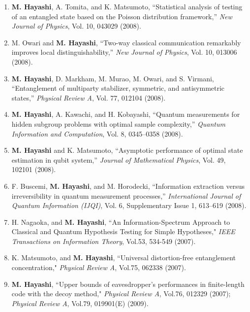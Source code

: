 \documentclass[a4paper,12pt,oneside]{article}
\begin{document}
\begin{enumerate}
\item   \textbf{M. Hayashi}, A. Tomita, and K. Matsumoto, 
``Statistical analysis of testing of an entangled state based on the Poisson distribution framework,'' 
{\em New Journal of Physics}, Vol. 10, 043029 (2008).

\item   M. Owari and \textbf{M. Hayashi}, 
``Two-way classical communication remarkably improves local distinguishability,'' 
{\em New Journal of Physics}, Vol. 10, 013006 (2008).

\item  \textbf{M. Hayashi}, D. Markham, M. Murao, M. Owari, and S. Virmani, 
``Entanglement of multiparty stabilizer, symmetric, and antisymmetric states,'' 
{\em Physical Review A}, Vol. 77, 012104 (2008).

\item \textbf{M. Hayashi}, A. Kawachi, and H. Kobayashi, 
``Quantum measurements for hidden subgroup problems with optimal sample complexity,'' 
{\em Quantum Information and Computation}, Vol. 8, 0345--0358 (2008). 

\item   \textbf{M. Hayashi} and K. Matsumoto, 
``Asymptotic performance of optimal state estimation in qubit system,'' 
{\em Journal of Mathematical Physics}, Vol. 49, 102101 (2008).

\item F. Buscemi, \textbf{M. Hayashi}, and M. Horodecki, 
``Information extraction versus irreversibility in quantum measurement processes,''
{\em International Journal of Quantum Information (IJQI)}, 
Vol. 6, Supplementary Issue 1, 613--619 (2008). 

\item
H. Nagaoka, and \textbf{M. Hayashi}, ``An Information-Spectrum Approach to Classical and Quantum Hypothesis Testing for Simple Hypotheses," 
{\em IEEE Transactions on Information Theory}, Vol.53, 534-549 (2007).

\item
K. Matsumoto, and \textbf{M. Hayashi}, ``Universal distortion-free entanglement concentration," 
{\em Physical Review A}, Vol.75, 062338 (2007).

\item 
\textbf{M. Hayashi}, ``Upper bounds of eavesdropper's performances in finite-length code with the decoy method," 
{\em Physical Review A}, Vol.76, 012329 (2007); 
{\em Physical Review A}, Vol.79, 019901(E) (2009).


\end{enumerate}
\end{document}
